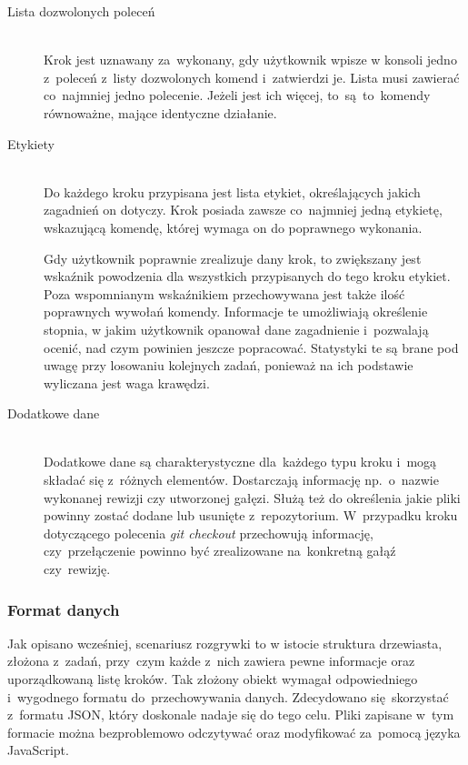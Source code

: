 \documentclass[12pt,a4paper,polish,thesis]{dcsbook}
\begin{document}
{\begin{description}
		\item[Lista dozwolonych poleceń] \hfill \\
		Krok jest uznawany za~wykonany, gdy użytkownik wpisze w konsoli jedno z~poleceń z~listy dozwolonych komend i~zatwierdzi je. Lista musi zawierać co~najmniej jedno polecenie. Jeżeli jest ich więcej, to~są~to~komendy równoważne, mające identyczne działanie.
		
		\item[Etykiety] \hfill \\
		Do każdego kroku przypisana jest lista etykiet, określających jakich zagadnień on dotyczy. Krok posiada zawsze co~najmniej jedną etykietę, wskazującą komendę, której wymaga on do poprawnego wykonania. 
		
		Gdy użytkownik poprawnie zrealizuje dany krok, to zwiększany jest wskaźnik powodzenia dla wszystkich przypisanych do tego kroku etykiet. Poza wspomnianym wskaźnikiem przechowywana jest także ilość poprawnych wywołań komendy. Informacje te umożliwiają określenie stopnia, w jakim użytkownik opanował dane zagadnienie i~pozwalają ocenić, nad czym powinien jeszcze popracować. Statystyki te są brane pod uwagę przy losowaniu kolejnych zadań, ponieważ na ich podstawie wyliczana jest waga krawędzi.
		
		\item[Dodatkowe dane] \hfill \\
		Dodatkowe dane są charakterystyczne dla~każdego typu kroku i~mogą składać się z~różnych elementów. Dostarczają informację np.~o~nazwie wykonanej rewizji czy utworzonej gałęzi. Służą też do określenia jakie pliki powinny zostać dodane lub usunięte z~repozytorium. W~przypadku kroku dotyczącego polecenia \textit{git checkout} przechowują informację, czy~przełączenie powinno być zrealizowane na~konkretną gałąź czy~rewizję.
	\end{description}

	\subsubsection{Format danych}

	Jak opisano wcześniej, scenariusz rozgrywki to w istocie struktura drzewiasta, złożona z~zadań, przy~czym każde z~nich zawiera pewne informacje oraz uporządkowaną listę kroków. Tak złożony obiekt wymagał odpowiedniego i~wygodnego formatu do~przechowywania danych. Zdecydowano się~skorzystać z~formatu JSON, który doskonale nadaje się do tego celu. Pliki zapisane w~tym formacie można bezproblemowo odczytywać oraz modyfikować za~pomocą języka JavaScript.

}
\end{document}
